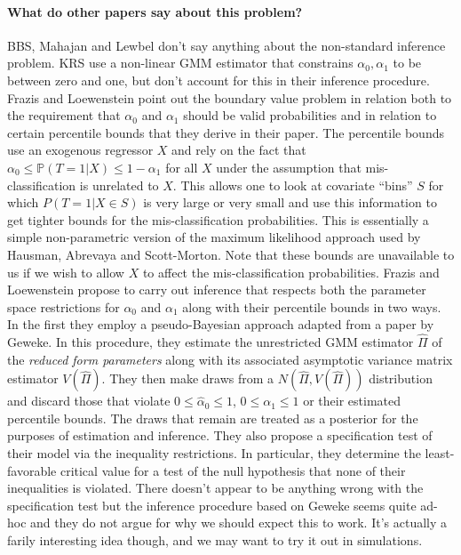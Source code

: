 \documentclass[12pt]{article}
\begin{document}
\paragraph{What do other papers say about this problem?}
BBS, Mahajan and Lewbel don't say anything about the non-standard inference problem.
KRS use a non-linear GMM estimator that constrains $\alpha_0, \alpha_1$ to be between zero and one, but don't account for this in their inference procedure.
Frazis and Loewenstein point out the boundary value problem in relation both to the requirement that $\alpha_0$ and $\alpha_1$ should be valid probabilities and in relation to certain percentile bounds that they derive in their paper.
The percentile bounds use an exogenous regressor $X$ and rely on the fact that $\alpha_0 \leq \mathbb{P}(T=1|X) \leq 1 - \alpha_1$ for all $X$ under the assumption that mis-classification is unrelated to $X$.
This allows one to look at covariate ``bins'' $S$ for which $P(T=1|X\in S)$ is very large or very small and use this information to get tighter bounds for the mis-classification probabilities.
This is essentially a simple non-parametric version of the maximum likelihood approach used by Hausman, Abrevaya and Scott-Morton.
Note that these bounds are unavailable to us if we wish to allow $X$ to affect the mis-classification probabilities.
Frazis and Loewenstein propose to carry out inference that respects both the parameter space restrictions for $\alpha_0$ and $\alpha_1$ along with their percentile bounds in two ways.
In the first they employ a pseudo-Bayesian approach adapted from a paper by Geweke.
In this procedure, they estimate the unrestricted GMM estimator $\widehat{\Pi}$ of the \emph{reduced form parameters} along with its associated asymptotic variance matrix estimator $V(\widehat{\Pi})$.
They then make draws from a $N(\widehat{\Pi}, V(\widehat{\Pi}))$ distribution and discard those that violate $0 \leq \widehat{\alpha}_0 \leq 1$, $0 \leq \alpha_1 \leq 1$ or their estimated percentile bounds.
The draws that remain are treated as a posterior for the purposes of estimation and inference.
They also propose a specification test of their model via the inequality restrictions.
In particular, they determine the least-favorable critical value for a test of the null hypothesis that none of their inequalities is violated.
There doesn't appear to be anything wrong with the specification test but the inference procedure based on Geweke seems quite ad-hoc and they do not argue for why we should expect this to work.
It's actually a farily interesting idea though, and we may want to try it out in simulations.
\end{document}
